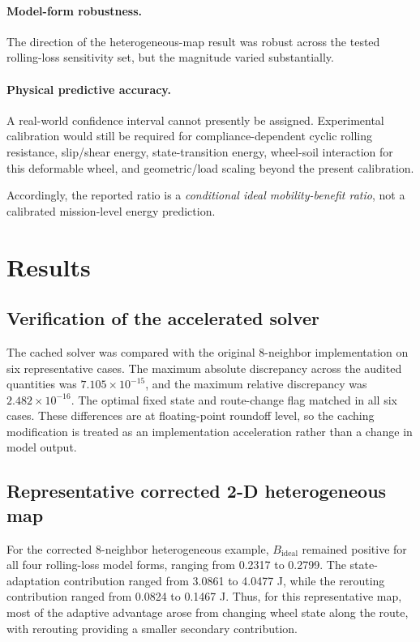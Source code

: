 \documentclass[11pt]{article}
\begin{document}
\paragraph{Model-form robustness.}
The direction of the heterogeneous-map result was robust across the tested rolling-loss sensitivity set, but the magnitude varied substantially.

\paragraph{Physical predictive accuracy.}
A real-world confidence interval cannot presently be assigned. Experimental calibration would still be required for compliance-dependent cyclic rolling resistance, slip/shear energy, state-transition energy, wheel-soil interaction for this deformable wheel, and geometric/load scaling beyond the present calibration.

Accordingly, the reported ratio is a \emph{conditional ideal mobility-benefit ratio}, not a calibrated mission-level energy prediction.

\section{Results}

\subsection{Verification of the accelerated solver}
The cached solver was compared with the original 8-neighbor implementation on six representative cases. The maximum absolute discrepancy across the audited quantities was \(7.105\times10^{-15}\), and the maximum relative discrepancy was \(2.482\times10^{-16}\). The optimal fixed state and route-change flag matched in all six cases. These differences are at floating-point roundoff level, so the caching modification is treated as an implementation acceleration rather than a change in model output.

\subsection{Representative corrected 2-D heterogeneous map}
For the corrected 8-neighbor heterogeneous example, \(B_{\mathrm{ideal}}\) remained positive for all four rolling-loss model forms, ranging from 0.2317 to 0.2799. The state-adaptation contribution ranged from 3.0861 to 4.0477 J, while the rerouting contribution ranged from 0.0824 to 0.1467 J. Thus, for this representative map, most of the adaptive advantage arose from changing wheel state along the route, with rerouting providing a smaller secondary contribution.
\end{document}
